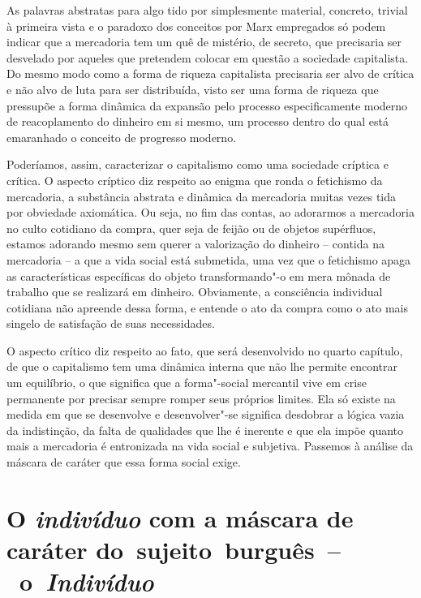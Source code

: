 As palavras abstratas para algo tido por simplesmente material,
concreto, trivial à primeira vista e o paradoxo dos conceitos por Marx
empregados só podem indicar que a mercadoria tem um quê de mistério, de
secreto, que precisaria ser desvelado por aqueles que pretendem colocar
em questão a sociedade capitalista. Do mesmo modo como a forma de
riqueza capitalista precisaria ser alvo de crítica e não alvo de luta
para ser distribuída, visto ser uma forma de riqueza que pressupõe a
forma dinâmica da expansão pelo processo especificamente moderno de
reacoplamento do dinheiro em si mesmo, um processo dentro do qual está
emaranhado o conceito de progresso moderno.

Poderíamos, assim, caracterizar o capitalismo como uma sociedade
críptica e crítica. O aspecto críptico diz respeito ao enigma que ronda
o fetichismo da mercadoria, a substância abstrata e dinâmica da
mercadoria muitas vezes tida por obviedade axiomática. Ou seja, no fim
das contas, ao adorarmos a mercadoria no culto cotidiano da compra, quer
seja de feijão ou de objetos supérfluos, estamos adorando mesmo sem
querer a valorização do dinheiro -- contida na mercadoria -- a que a
vida social está submetida, uma vez que o fetichismo apaga as
características específicas do objeto transformando"-o em mera mônada de
trabalho que se realizará em dinheiro. Obviamente, a consciência
individual cotidiana não apreende dessa forma, e entende o ato da compra
como o ato mais singelo de satisfação de suas necessidades.

O aspecto crítico diz respeito ao fato, que será desenvolvido no quarto
capítulo, de que o capitalismo tem uma dinâmica interna que não lhe
permite encontrar um equilíbrio, o que significa que a forma"-social
mercantil vive em crise permanente por precisar sempre romper seus
próprios limites. Ela só existe na medida em que se desenvolve e
desenvolver"-se significa desdobrar a lógica vazia da indistinção, da
falta de qualidades que lhe é inerente e que ela impõe quanto mais a
mercadoria é entronizada na vida social e subjetiva. Passemos à análise
da máscara de caráter que essa forma social exige.

\section{O \emph{indivíduo} com a máscara de caráter do~sujeito~burguês~--~o~\emph{Indivíduo}}

